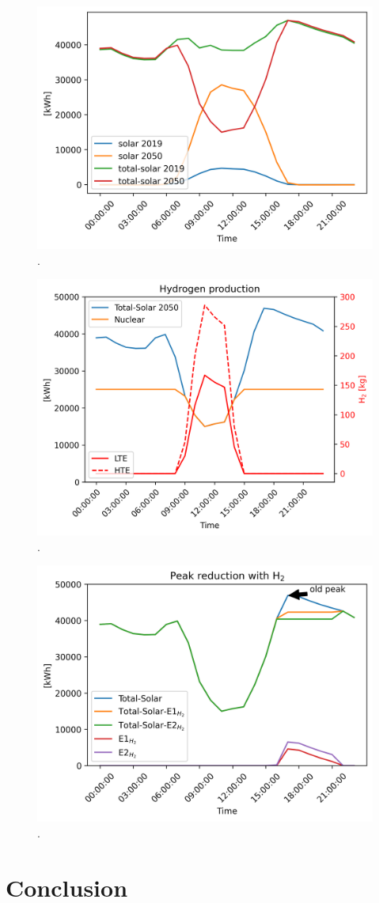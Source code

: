 \documentclass{anstrans}
\begin{document}
\begin{figure}[H]
	\centering
	\includegraphics[width=0.7\linewidth]{figures/uiuc-duck.png}
	\hfill
	\caption{.}
	\label{fig:uiuc-duck}
\end{figure}

\begin{figure}[H]
	\centering
	\includegraphics[width=0.7\linewidth]{figures/uiuc-hydro2.png}
	\hfill
	\caption{.}
	\label{fig:uiuc-hydro2}
\end{figure}

\begin{figure}[H]
	\centering
	\includegraphics[width=0.7\linewidth]{figures/uiuc-hydro3.png}
	\hfill
	\caption{.}
	\label{fig:uiuc-hydro3}
\end{figure}

\section{Conclusion}





\end{document}
